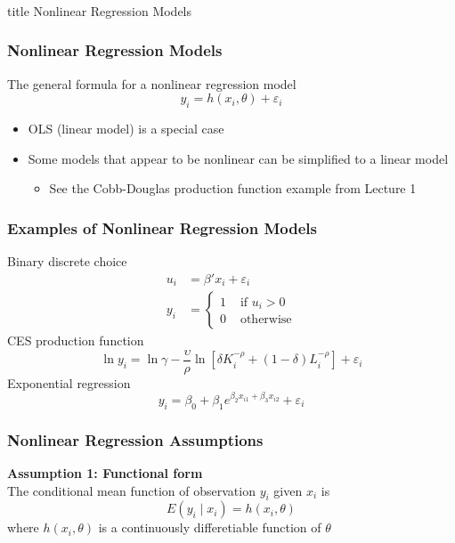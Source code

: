 \documentclass{beamer}
\begin{document}
\begin{frame}\frametitle{}
    \vfill
    \centering
    \begin{beamercolorbox}[center]{title}
        \Large Nonlinear Regression Models
    \end{beamercolorbox}
    \vfill
\end{frame}

\begin{frame}\frametitle{Nonlinear Regression Models}
    The general formula for a nonlinear regression model
    $$y_i = h(x_i, \theta) + \varepsilon_i$$
    \begin{itemize}
        \item OLS (linear model) is a special case
        \item Some models that appear to be nonlinear can be simplified to a linear model
        \begin{itemize}
            \item See the Cobb-Douglas production function example from Lecture 1
        \end{itemize}
    \end{itemize}
\end{frame}

\begin{frame}\frametitle{Examples of Nonlinear Regression Models}
    Binary discrete choice
    \begin{align*}
        u_i &= \beta' x_i + \varepsilon_i \\
        y_i &= 
            \begin{cases}
                1 & \text{ if } u_i > 0 \\
                0 & \text{ otherwise}
            \end{cases}
    \end{align*}
    \vspace{1ex}
    CES production function
    $$\ln y_i = \ln \gamma - \frac{\upsilon}{\rho} \ln \left[ \delta K_i^{-\rho} + \left( 1 - \delta \right) L_i^{-\rho} \right] + \varepsilon_i$$
    \vspace{1ex}
    Exponential regression
    $$y_i = \beta_0 + \beta_1 e^{\beta _2 x_{i1} + \beta_3 x_{i2}} + \varepsilon _i$$
\end{frame}

\begin{frame}\frametitle{Nonlinear Regression Assumptions}
    \textbf{Assumption 1: Functional form} \\
    \vspace{3ex}
    The conditional mean function of observation $y_i$ given $x_i$ is
    $$E(y_i \mid x_i) = h(x_i, \theta)$$
    where $h(x_i, \theta)$ is a continuously differetiable function of $\theta$
\end{frame}
\end{document}
